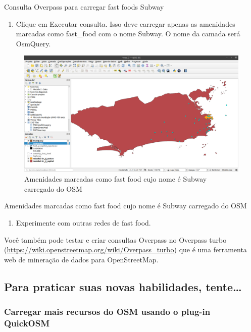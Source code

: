\documentclass[
  portuguese,
]{krantz}
\providecommand{\tightlist}{%
  \setlength{\itemsep}{0pt}\setlength{\parskip}{0pt}}
\begin{document}
Consulta Overpass para carregar fast foods Subway

\begin{enumerate}
\def\labelenumi{\arabic{enumi}.}
\setcounter{enumi}{3}
\tightlist
\item
  Clique em Executar consulta. Isso deve carregar apenas as amenidades marcadas como fast\_food com o nome Subway. O nome da camada será OsmQuery.
\end{enumerate}

\begin{figure}
\centering
\includegraphics{media/modulo3/overpass-3.png}
\caption{Amenidades marcadas como fast food cujo nome é Subway carregado do OSM}
\end{figure}

Amenidades marcadas como fast food cujo nome é Subway carregado do OSM

\begin{enumerate}
\def\labelenumi{\arabic{enumi}.}
\setcounter{enumi}{4}
\tightlist
\item
  Experimente com outras redes de fast food.
\end{enumerate}

Você também pode testar e criar consultas Overpass no Overpass turbo (\url{https://wiki.openstreetmap.org/wiki/Overpass_turbo}) que é uma ferramenta web de mineração de dados para OpenStreetMap.

\hypertarget{para-praticar-suas-novas-habilidades-tente-2}{%
\subsection{Para praticar suas novas habilidades, tente\ldots{}}\label{para-praticar-suas-novas-habilidades-tente-2}}

\hypertarget{carregar-mais-recursos-do-osm-usando-o-plug-in-quickosm}{%
\subsubsection{\texorpdfstring{\textbf{Carregar mais recursos do OSM usando o plug-in QuickOSM}}{Carregar mais recursos do OSM usando o plug-in QuickOSM}}\label{carregar-mais-recursos-do-osm-usando-o-plug-in-quickosm}}
\end{document}
